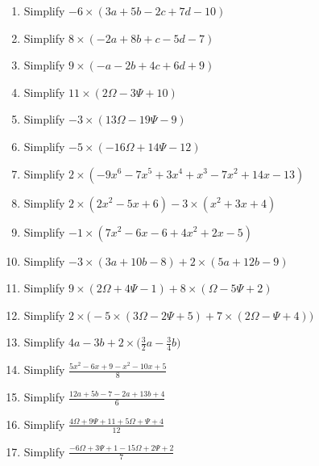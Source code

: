 \documentclass[16pt]{article}
\theoremstyle{remark}
\begin{document}
\begin{enumerate}
\item Simplify $\displaystyle{-6\times(3a+5b-2c+7d-10)}$
\vspace{5cm}
\newpage
\item Simplify $\displaystyle{8\times(-2a+8b+c-5d-7)}$
\vspace{5cm}
\item Simplify $\displaystyle{9\times(-a-2b+4c+6d+9)}$
\vspace{5cm}
\item Simplify $\displaystyle{11\times(2\Omega-3\Psi+10)}$
\vspace{5cm}
\item Simplify $\displaystyle{-3\times(13\Omega-19\Psi-9)}$
\vspace{5cm}
\newpage
\item Simplify $\displaystyle{-5\times(-16\Omega+14\Psi-12)}$
\vspace{5cm}
\item Simplify $\displaystyle{2\times(-9x^6-7x^5+3x^4+x^3-7x^2+14x-13)}$
\vspace{5cm}
\item Simplify $\displaystyle{2\times(2x^2-5x+6)-3\times(x^2+3x+4)}$
\vspace{5cm}

\item Simplify $\displaystyle{-1\times(7x^2-6x-6+4x^2+2x-5)}$
\vspace{5cm}
\newpage

\item Simplify $\displaystyle{-3\times(3a+10b-8)+2\times(5a+12b-9)}$
\vspace{5cm}

\item Simplify $\displaystyle{9\times(2\Omega+4\Psi-1)+8\times(\Omega-5\Psi+2)}$
\vspace{5cm}

\item Simplify $\displaystyle{2\times\bigg(-5\times(3\Omega-2\Psi+5)+7\times(2\Omega-\Psi+4)\bigg)}$
\vspace{5cm}

\item Simplify $\displaystyle{4a-3b + 2\times\bigg(\frac{3}{2}a -\frac{3}{4}b\bigg)}$
\vspace{5cm}

\newpage

\item Simplify $\displaystyle{\frac{5x^2-6x+9-x^2-10x+5}{8}}$
\vspace{5cm}
\item Simplify $\displaystyle{\frac{12a+5b-7-2a+13b+4}{6}}$
\vspace{5cm}
\item Simplify $\displaystyle{\frac{4\Omega+9\Psi+11+5\Omega+\Psi+4}{12}}$
\vspace{5cm}
\item Simplify $\displaystyle{\frac{-6\Omega+3\Psi+1-15\Omega+2\Psi+2}{7}}$
\vspace{5cm}
\newpage


\end{enumerate}
\end{document}
